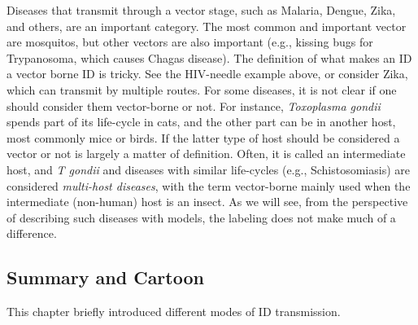 \documentclass[]{article}
\theoremstyle{definition}
\theoremstyle{definition}
\theoremstyle{definition}
\theoremstyle{remark}
\begin{document}
Diseases that transmit through a vector stage, such as Malaria, Dengue,
Zika, and others, are an important category. The most common and
important vector are mosquitos, but other vectors are also important
(e.g., kissing bugs for Trypanosoma, which causes Chagas disease). The
definition of what makes an ID a vector borne ID is tricky. See the
HIV-needle example above, or consider Zika, which can transmit by
multiple routes. For some diseases, it is not clear if one should
consider them vector-borne or not. For instance, \emph{Toxoplasma
gondii} spends part of its life-cycle in cats, and the other part can be
in another host, most commonly mice or birds. If the latter type of host
should be considered a vector or not is largely a matter of definition.
Often, it is called an intermediate host, and \emph{T gondii} and
diseases with similar life-cycles (e.g., Schistosomiasis) are considered
\emph{multi-host diseases}, with the term vector-borne mainly used when
the intermediate (non-human) host is an insect. As we will see, from the
perspective of describing such diseases with models, the labeling does
not make much of a difference.

\subsection{Summary and Cartoon}\label{summary-and-cartoon-4}

This chapter briefly introduced different modes of ID transmission.
\end{document}

